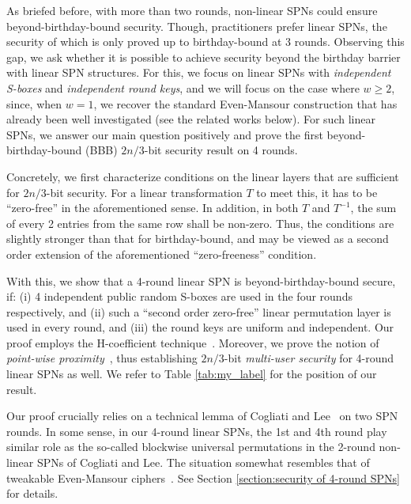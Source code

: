 \documentclass[journal=tosc,final,nohyperref]{iacrtrans}
\begin{document}
As briefed before, with more than two rounds, non-linear SPNs could ensure beyond-birthday-bound security. Though, practitioners prefer linear SPNs, the security of which is only proved up to birthday-bound at 3 rounds.
%
%
%
Observing this gap, we ask whether it is possible to achieve security beyond the birthday barrier with linear SPN structures. For this, we focus on linear SPNs with {\it independent S-boxes} and {\it independent round keys}, and we will focus on the case where $w\geq2$, since, when $w = 1$, we recover the standard Even-Mansour construction that has already been well investigated (see the related works below). For such linear SPNs, we answer our main question positively and prove the first beyond-birthday-bound (BBB) $2n/3$-bit security result on 4 rounds.


Concretely, we first characterize conditions on the linear layers that are sufficient for $2n/3$-bit security. For a linear transformation $T$ to meet this, it has to be ``zero-free'' in the aforementioned sense. In addition, in both $T$ and $T^{-1}$, the sum of every 2 entries from the same row shall be non-zero. Thus, the conditions are slightly stronger than that for birthday-bound, and may be viewed as a second order extension of the aforementioned ``zero-freeness'' condition.
%
%

With this, we show that a 4-round linear SPN is beyond-birthday-bound secure, if: (i) 4 independent public random S-boxes are used in the four rounds respectively, and (ii) such a ``second order zero-free'' linear permutation layer is used in every round, and (iii) the round keys are uniform and independent. Our proof employs the H-coefficient technique~\cite{SAC:Patarin08}. Moreover, we prove the notion of {\it point-wise proximity}~\cite{C:HoaTes16}, thus establishing $2n/3$-bit {\it multi-user security} for 4-round linear SPNs as well. We refer to Table \ref{tab:my_label} for the position of our result.


Our proof crucially relies on a technical lemma of Cogliati and Lee~\cite{EPRINT:CogLee18} on two SPN rounds. In some sense, in our 4-round linear SPNs, the 1st and 4th round play similar role as the so-called blockwise universal permutations in the 2-round non-linear SPNs of Cogliati and Lee. The situation somewhat resembles that of tweakable Even-Mansour ciphers~\cite{C:CogLamSeu15,AC:CogSeu15}. See Section \ref{section:security of 4-round SPNs} for details.
\end{document}
